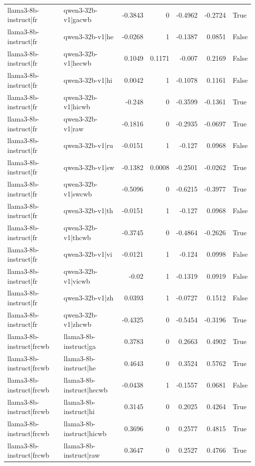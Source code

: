 \begin{table}
\begin{tabular}{l l r r r r l}
llama3-8b-instruct|fr & qwen3-32b-v1|gacwb & -0.3843 & 0 & -0.4962 & -0.2724 & True \\
llama3-8b-instruct|fr & qwen3-32b-v1|he & -0.0268 & 1 & -0.1387 & 0.0851 & False \\
llama3-8b-instruct|fr & qwen3-32b-v1|hecwb & 0.1049 & 0.1171 & -0.007 & 0.2169 & False \\
llama3-8b-instruct|fr & qwen3-32b-v1|hi & 0.0042 & 1 & -0.1078 & 0.1161 & False \\
llama3-8b-instruct|fr & qwen3-32b-v1|hicwb & -0.248 & 0 & -0.3599 & -0.1361 & True \\
llama3-8b-instruct|fr & qwen3-32b-v1|raw & -0.1816 & 0 & -0.2935 & -0.0697 & True \\
llama3-8b-instruct|fr & qwen3-32b-v1|ru & -0.0151 & 1 & -0.127 & 0.0968 & False \\
llama3-8b-instruct|fr & qwen3-32b-v1|sw & -0.1382 & 0.0008 & -0.2501 & -0.0262 & True \\
llama3-8b-instruct|fr & qwen3-32b-v1|swcwb & -0.5096 & 0 & -0.6215 & -0.3977 & True \\
llama3-8b-instruct|fr & qwen3-32b-v1|th & -0.0151 & 1 & -0.127 & 0.0968 & False \\
llama3-8b-instruct|fr & qwen3-32b-v1|thcwb & -0.3745 & 0 & -0.4864 & -0.2626 & True \\
llama3-8b-instruct|fr & qwen3-32b-v1|vi & -0.0121 & 1 & -0.124 & 0.0998 & False \\
llama3-8b-instruct|fr & qwen3-32b-v1|vicwb & -0.02 & 1 & -0.1319 & 0.0919 & False \\
llama3-8b-instruct|fr & qwen3-32b-v1|zh & 0.0393 & 1 & -0.0727 & 0.1512 & False \\
llama3-8b-instruct|fr & qwen3-32b-v1|zhcwb & -0.4325 & 0 & -0.5454 & -0.3196 & True \\
llama3-8b-instruct|frcwb & llama3-8b-instruct|ga & 0.3783 & 0 & 0.2663 & 0.4902 & True \\
llama3-8b-instruct|frcwb & llama3-8b-instruct|he & 0.4643 & 0 & 0.3524 & 0.5762 & True \\
llama3-8b-instruct|frcwb & llama3-8b-instruct|hecwb & -0.0438 & 1 & -0.1557 & 0.0681 & False \\
llama3-8b-instruct|frcwb & llama3-8b-instruct|hi & 0.3145 & 0 & 0.2025 & 0.4264 & True \\
llama3-8b-instruct|frcwb & llama3-8b-instruct|hicwb & 0.3696 & 0 & 0.2577 & 0.4815 & True \\
llama3-8b-instruct|frcwb & llama3-8b-instruct|raw & 0.3647 & 0 & 0.2527 & 0.4766 & True \\

\end{tabular}
\end{table}

